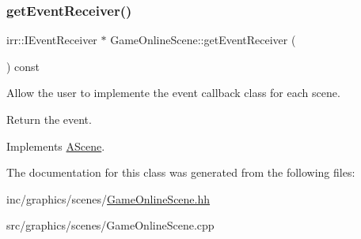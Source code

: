 \subsubsection{\texorpdfstring{get\+Event\+Receiver()}{getEventReceiver()}}
{\footnotesize\ttfamily irr\+::\+I\+Event\+Receiver $\ast$ Game\+Online\+Scene\+::get\+Event\+Receiver (\begin{DoxyParamCaption}{ }\end{DoxyParamCaption}) const\hspace{0.3cm}{\ttfamily [virtual]}}



Allow the user to implemente the event callback class for each scene. 

Return the event. 

Implements \hyperlink{classAScene_af521e5e6d30a5d2e5d30eb333e4d3abd}{A\+Scene}.



The documentation for this class was generated from the following files\+:\begin{DoxyCompactItemize}
\item 
inc/graphics/scenes/\hyperlink{GameOnlineScene_8hh}{Game\+Online\+Scene.\+hh}\item 
src/graphics/scenes/Game\+Online\+Scene.\+cpp\end{DoxyCompactItemize}
